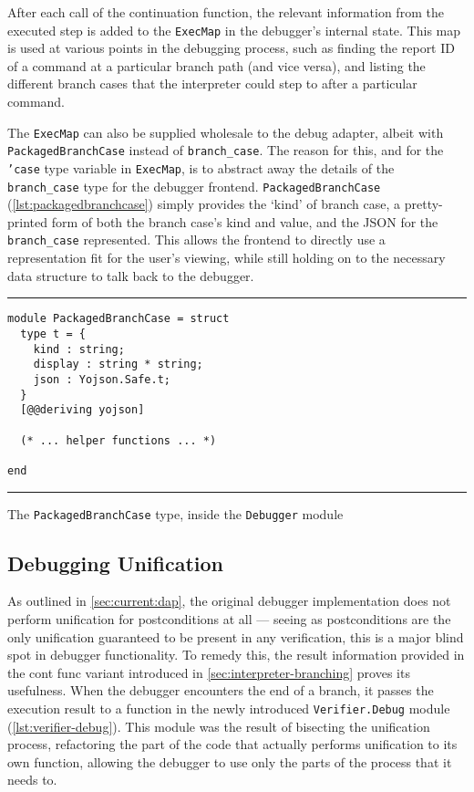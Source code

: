 After each call of the continuation function, the relevant information from
the executed step is added to the \texttt{ExecMap} in the debugger's internal
state. This map is used at various points in the debugging process, such as
finding the report ID of a command at a particular branch path (and vice versa),
and listing the different branch cases that the interpreter could step to after
a particular command.

The \texttt{ExecMap} can also be supplied wholesale to the debug adapter,
albeit with \texttt{PackagedBranchCase} instead of \texttt{branch\_case}.
The reason for this, and for the \texttt{'case} type variable in
\texttt{ExecMap}, is to abstract away the details of the \texttt{branch\_case}
type for the debugger frontend. \texttt{PackagedBranchCase}
(\autoref{lst:packagedbranchcase}) simply provides the `kind' of branch case,
a pretty-printed form of both the branch case's kind and value, and the JSON
for the \texttt{branch\_case} represented. This allows the frontend to directly
use a representation fit for the user's viewing, while still holding on to the
necessary data structure to talk back to the debugger.

\begin{listing}[!ht]
\noindent\rule{\textwidth}{0.5pt}
\vspace{-0.6cm}
\begin{verbatim}
module PackagedBranchCase = struct
  type t = {
    kind : string;
    display : string * string;
    json : Yojson.Safe.t;
  }
  [@@deriving yojson]

  (* ... helper functions ... *)

end
\end{verbatim}
\vspace{-0.4cm}
\noindent\rule{\textwidth}{0.5pt}
\vspace{-0.6cm}
\caption{The \texttt{PackagedBranchCase} type, inside the \texttt{Debugger} module}
\label{lst:packagedbranchcase}
\end{listing}


\subsection{Debugging Unification}

As outlined in \autoref{sec:current:dap}, the original debugger implementation
does not perform unification for postconditions at all --- seeing as
postconditions are the only unification guaranteed to be present in any
verification, this is a major blind spot in debugger functionality. To remedy
this, the result information provided in the \texttt{} cont func variant
introduced in \autoref{sec:interpreter-branching} proves its usefulness.
When the debugger encounters the end of a branch, it passes the execution
result to a function in the newly introduced \texttt{Verifier.Debug} module
(\autoref{lst:verifier-debug}). This module was the result of bisecting the
unification process, refactoring the part of the code that actually performs
unification to its own function, allowing the debugger to use only the parts
of the process that it needs to.

